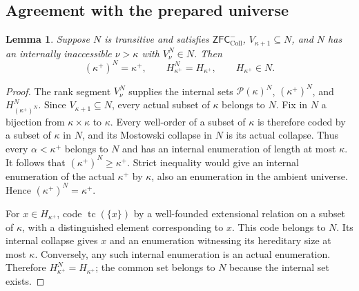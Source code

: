 \documentclass[10pt,a4paper]{amsart}
\newtheorem{lemma}[theorem]{Lemma}
\theoremstyle{definition}
\theoremstyle{remark}
\newcommand{\ZFCc}{\mathsf{ZFC}^{-}_{\mathrm{Coll}}}
\DeclareMathOperator{\tc}{tc}
\begin{document}
\subsection{Agreement with the prepared universe}

\begin{lemma}\label{lem:target-H}
Suppose \(N\) is transitive and satisfies \(\ZFCc\),
\(V_{\kappa+1}\subseteq N\), and \(N\) has an
internally inaccessible \(\nu>\kappa\) with
\(V_\nu^N\in N\). Then
\[
 (\kappa^+)^N=\kappa^+,
 \qquad H_{\kappa^+}^N=H_{\kappa^+},
 \qquad H_{\kappa^+}\in N.
\]
\end{lemma}
\begin{proof}
The rank segment \(V_\nu^N\) supplies the internal sets
\(\mathcal P(\kappa)^N\), \((\kappa^+)^N\), and
\(H_{(\kappa^+)^N}^N\). Since \(V_{\kappa+1}\subseteq N\),
every actual subset of \(\kappa\) belongs to \(N\).
Fix in \(N\) a bijection from \(\kappa\times\kappa\) to
\(\kappa\). Every well-order of a subset of \(\kappa\) is
therefore coded by a subset of \(\kappa\) in \(N\), and its
Mostowski collapse in \(N\) is its actual collapse. Thus every
\(\alpha<\kappa^+\) belongs to \(N\) and has an internal
enumeration of length at most \(\kappa\). It follows that
\((\kappa^+)^N\geq\kappa^+\). Strict inequality would give
an internal enumeration of the actual \(\kappa^+\) by
\(\kappa\), also an enumeration in the ambient universe.
Hence \((\kappa^+)^N=\kappa^+\).

For \(x\in H_{\kappa^+}\), code \(\tc(\{x\})\) by a
well-founded extensional relation on a subset of \(\kappa\),
with a distinguished element corresponding to \(x\). This
code belongs to \(N\). Its internal collapse gives \(x\)
and an enumeration witnessing its hereditary size at most
\(\kappa\). Conversely, any such internal enumeration is an
actual enumeration. Therefore
\(H_{\kappa^+}^N=H_{\kappa^+}\); the common set belongs
to \(N\) because the internal set exists.
\end{proof}
\end{document}
